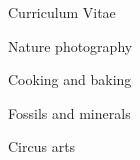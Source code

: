 \documentclass[11pt,a4paper]{article}
\begin{document}
\begin{cv}{Curriculum Vitae}
\begin{cvlist}{}
			\item Nature photography
			
			\item Cooking and baking
			
			\item Fossils and minerals
			
			\item Circus arts
			
		\end{cvlist}
	
		
		\vfill
		\date{}
		
	\end{cv}
	
\end{document}
